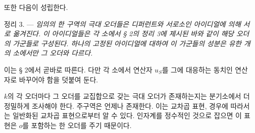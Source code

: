 또한 다음이 성립한다.

\medskip
\noindent\textsc{정리 3. ---} \emph{임의의 한 구역의 극대 오더들은 디퍼런트와 서로소인 아이디얼에 의해 서로 옮겨진다. 이 아이디얼들은 각 소에서 § 2의 정리 3에 제시된 바와 같이 해당 오더의 가군들로 구성된다. 하나의 고정된 아이디얼에 대하여 이 가군들의 성분은 유한 개의 소에서만 그 오더와 다르다.}

이는 § 2에서 곧바로 따른다. 다만 각 소에서 연산자 $u_S$를 그에 대응하는 동치인 연산자로 바꾸어야 함을 덧붙여 둔다.

$k$의 각 오더마다 그 오더를 교집합으로 갖는 극대 오더가 존재하는지는 분기소에서 더 정밀하게 조사해야 한다. 주구역은 언제나 존재한다. 이는 교차곱 표현, 경우에 따라서는 일반화된 교차곱 표현으로부터 알 수 있다. 인자계를 정수적인 것으로 잡으면 이 표현은 $o$를 포함하는 한 오더를 주기 때문이다.
